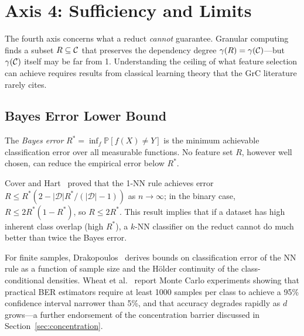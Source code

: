 \section{Axis 4: Sufficiency and Limits}
\label{sec:sufficiency}

The fourth axis concerns what a reduct \emph{cannot} guarantee.  Granular
computing finds a subset $R \subseteq \mathcal{C}$ that preserves the dependency
degree $\gamma(R) = \gamma(\mathcal{C})$---but $\gamma(\mathcal{C})$ itself may be far from 1.
Understanding the ceiling of what feature selection can achieve requires
results from classical learning theory that the GrC literature rarely cites.

\subsection{Bayes Error Lower Bound}
\label{sec:bayes}

The \emph{Bayes error} $R^* = \inf_f \mathbb{P}[f(X) \neq Y]$ is the
minimum achievable classification error over all measurable functions.
No feature set $R$, however well chosen, can reduce the empirical error
below $R^*$.

Cover and Hart~\cite{CoverHart1967} proved that the 1-NN rule achieves
error $R \leq R^*(2 - |\mathcal{D}|R^*/(|\mathcal{D}|-1))$ as $n\to\infty$;
in the binary case, $R \leq 2R^*(1-R^*)$, so $R \leq 2R^*$.  This result
implies that if a dataset has high inherent class overlap (high $R^*$), a
$k$-NN classifier on the reduct cannot do much better than twice the Bayes
error.

For finite samples, Drakopoulos~\cite{Drakopoulos1995} derives bounds on
classification error of the NN rule as a function of sample size and the
H\"older continuity of the class-conditional densities.  Wheat et
al.~\cite{Wheat2025BER} report Monte Carlo experiments showing that
practical BER estimators require at least 1000 samples per class to achieve
a 95\% confidence interval narrower than 5\%, and that accuracy degrades
rapidly as $d$ grows---a further endorsement of the concentration barrier
discussed in Section~\ref{sec:concentration}.

